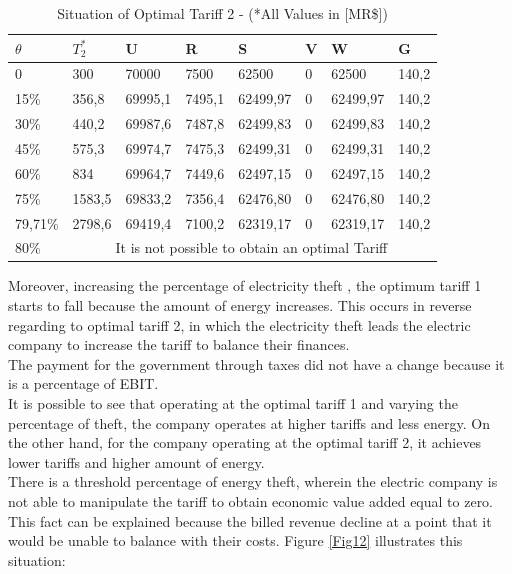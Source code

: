 \documentclass[preprint,12pt]{elsarticle}
\begin{document}
\begin{table}[h]%
\centering
\caption{Situation of Optimal Tariff 2 - (*All Values in [MR\$])}

\begin{tabular}{p{15mm}p{15mm}p{15mm}p{15mm}p{15mm}p{6mm}p{15mm}p{15mm}}%
\hline
$\theta$&$T_2^*$&U&R&S&V&W&G\\
\hline
0&300&70000&7500&62500&0&62500&140,2\\
15\%&356,8&69995,1&7495,1&62499,97&0&62499,97&140,2\\
30\%&440,2&69987,6&7487,8&62499,83&0&62499,83&140,2\\
45\%&575,3&69974,7&7475,3&62499,31&0&62499,31&140,2\\
60\%&834&69964,7&7449,6&62497,15&0&62497,15&140,2\\
75\%&1583,5&69833,2&7356,4&62476,80&0&62476,80&140,2\\
79,71\%&2798,6&69419,4&7100,2&62319,17&0&62319,17&140,2\\
80\%&\multicolumn{7}{c}{It is not possible to obtain an optimal Tariff}\\

\hline
\end{tabular}
\label{tD}
\end{table}
Moreover, increasing the percentage of electricity theft , the optimum tariff 1 starts to fall because the amount of energy increases. This occurs in reverse regarding to optimal tariff 2, in which the electricity theft leads the electric company to increase the tariff to balance their finances. \\

The payment for the government through taxes did not have a change because it is a percentage of EBIT. \\
It is possible to see that operating at the optimal tariff 1 and varying the percentage of theft, the company operates at higher tariffs and less energy. On the other hand, for the company operating at the optimal tariff 2, it achieves lower tariffs and higher amount of energy. \\
There is a threshold percentage of energy theft, wherein the electric company is not able to manipulate the tariff to obtain economic value added equal to zero. This fact can be explained because the billed revenue decline at a point that it would be unable to balance with their costs. Figure \ref{Fig12} illustrates this situation:\\
\end{document}
